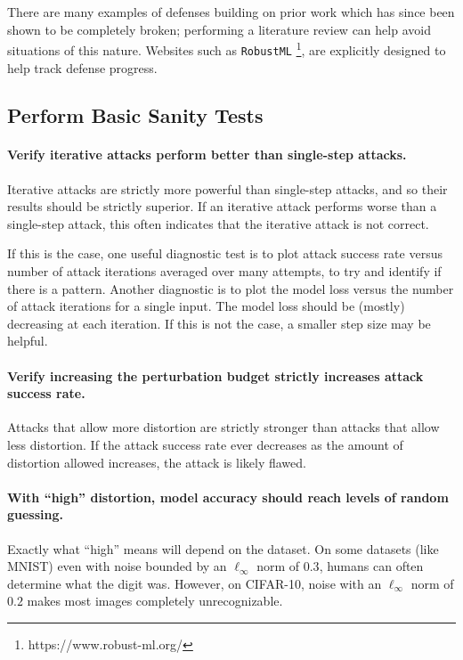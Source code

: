 \documentclass{article} %
\begin{document}
There are many examples of defenses building on prior work which
has since been shown to be completely broken; performing a literature
review can help avoid situations of this nature. Websites such
as \texttt{RobustML}%
\footnote{https://www.robust-ml.org/},
are explicitly designed to help track defense progress.

\subsection{Perform Basic Sanity Tests}
\label{sec:sanitycheck}

\paragraph{Verify iterative attacks perform better than single-step attacks.}
Iterative attacks are strictly more powerful than single-step
attacks, and so their results should be strictly superior.
%
If an
iterative attack performs worse than a single-step attack, this often
indicates that the iterative attack is not correct.

If this is the case, one useful diagnostic test is to plot attack
success rate versus number of attack iterations averaged over many
attempts, to try and identify if there is a pattern.
%
Another diagnostic is to plot the model loss versus the number of attack
iterations for a single input.
%
The model loss should be (mostly) decreasing at each iteration.
%
If this is not the case, a smaller step size may be helpful.

\paragraph{Verify increasing the perturbation budget strictly
increases attack success rate.}
\label{sec:monodistortion}
Attacks that allow more distortion are strictly stronger
than attacks that allow less distortion.
%
If the attack success rate
ever decreases as the amount of distortion allowed increases, the
attack is likely flawed.

\paragraph{With ``high'' distortion, model accuracy should reach
  levels of random guessing.}
%
Exactly what ``high'' means will depend on the dataset.
%
On some datasets (like MNIST) even with noise bounded by an
$\ell_\infty$ norm of $0.3$, humans can often determine what
the digit was.
%
However, on CIFAR-10, noise with an $\ell_\infty$ norm of $0.2$ makes most
images completely unrecognizable.
\end{document}
